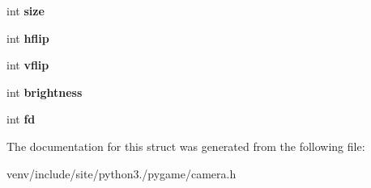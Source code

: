 \begin{DoxyCompactItemize}
int {\bfseries size}
\item 
\mbox{\label{struct_py_camera_object_acd4cfc68c559246c47c7be5c17e095b3}} 
int {\bfseries hflip}
\item 
\mbox{\label{struct_py_camera_object_a01a1fbf762eb7bbd3baf059c38afea78}} 
int {\bfseries vflip}
\item 
\mbox{\label{struct_py_camera_object_a73eb9df751b6734cde3f12601e85e98f}} 
int {\bfseries brightness}
\item 
\mbox{\label{struct_py_camera_object_a39900a9232a9704a99c74a87e8e5fa96}} 
int {\bfseries fd}
\end{DoxyCompactItemize}


The documentation for this struct was generated from the following file\+:\begin{DoxyCompactItemize}
\item 
venv/include/site/python3./pygame/camera.\+h\end{DoxyCompactItemize}
